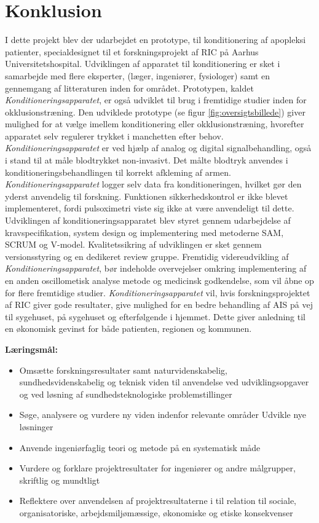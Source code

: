 \chapter{Konklusion}
I dette projekt blev der udarbejdet en prototype, til konditionering af apopleksi patienter, specialdesignet til et forskningsprojekt af RIC på Aarhus Universitetshospital. Udviklingen af apparatet til konditionering er sket i samarbejde med flere eksperter, (læger, ingeniører, fysiologer) samt en gennemgang af litteraturen inden for området. Prototypen, kaldet \textit{Konditioneringsapparatet}, er også udviklet til brug i fremtidige studier inden for okklusionstræning.
Den udviklede prototype (se figur \ref{fig:oversigtsbillede}) giver mulighed for at vælge imellem konditionering eller okklusionstræning, hvorefter apparatet selv regulerer trykket i manchetten efter behov. \textit{Konditioneringsapparatet} er ved hjælp af analog og digital signalbehandling, også i stand til at måle blodtrykket non-invasivt. Det målte blodtryk anvendes i konditioneringsbehandlingen til korrekt afkleming af armen. \textit{Konditioneringsapparatet} logger selv data fra konditioneringen, hvilket gør den yderst anvendelig til forskning. Funktionen sikkerhedskontrol er ikke blevet implementeret, fordi pulsoximetri viste sig ikke at være anvendeligt til dette.
Udviklingen af konditioneringsapparatet blev styret gennem udarbejdelse af kravspecifikation, system design og implementering med metoderne SAM, SCRUM og V-model. Kvalitetssikring af udviklingen er sket gennem versionsstyring og en dedikeret review gruppe.
Fremtidig videreudvikling af \textit{Konditioneringsapparatet}, bør indeholde overvejelser omkring implementering af en anden oscillometisk analyse metode og medicinsk godkendelse, som vil åbne op for flere fremtidige studier.
\textit{Konditioneringsapparatet} vil, hvis forskningsprojektet af RIC giver gode resultater, give mulighed for en bedre behandling af AIS på vej til sygehuset, på sygehuset og efterfølgende i hjemmet. Dette giver anledning til en økonomisk gevinst for både patienten, regionen og kommunen. 

\label{SidsteSide}

\textbf{Læringsmål:}
\begin{itemize}
	\item Omsætte forskningsresultater samt naturvidenskabelig, sundhedsvidenskabelig og teknisk viden til anvendelse ved udviklingsopgaver og ved løsning af sundhedsteknologiske problemstillinger
	\item Søge, analysere og vurdere ny viden indenfor relevante områder
	Udvikle nye løsninger
	\item Anvende ingeniørfaglig teori og metode på en systematisk måde
	\item Vurdere og forklare projektresultater for ingeniører og andre målgrupper, skriftlig og mundtligt
	
	\item Reflektere over anvendelsen af projektresultaterne i til relation til sociale, organisatoriske, arbejdsmiljømæssige, økonomiske og etiske konsekvenser
\end{itemize}




